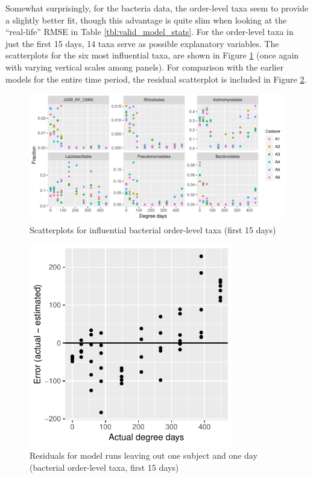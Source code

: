\documentclass{article}
\begin{document}
Somewhat surprisingly, for the bacteria data, the order-level taxa
seem to provide a slightly better fit, though this advantage is quite
slim when looking at the ``real-life'' RMSE in Table
\ref{tbl:valid_model_stats}.  For the order-level taxa in just the
first 15 days, 14 taxa serve as possible explanatory variables.  The
scatterplots for the six most influential taxa, are shown in Figure
\ref{fig:infl_bac_first_15_days_family_scatter} (once again with
varying vertical scales among panels).  For comparison with the
earlier models for the entire time period, the residual scatterplot is
included in Figure \ref{fig:leave_one_out_resids_bac_order_taxa_first_15}.
\begin{figure}
  \centering
  \includegraphics[width=6.5in]{../revise_algorithm/only_orders/first_two_weeks/hit_1perc_twice/infl_bac_order_first_two_weeks_scatter}
  \caption{Scatterplots for influential bacterial order-level taxa (first 15 days)}
  \label{fig:infl_bac_first_15_days_family_scatter}
\end{figure}
\begin{figure}
  \centering
  \includegraphics[width=3.5in]{../revise_algorithm/only_orders/first_two_weeks/hit_1perc_twice/leave_out_one_subj_and_one_day_residuals}
  \caption{Residuals for model runs leaving out one subject and one day (bacterial order-level taxa, first 15 days)}
  \label{fig:leave_one_out_resids_bac_order_taxa_first_15}
\end{figure}
\end{document}
